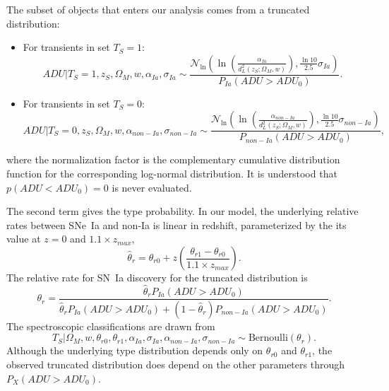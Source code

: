 \documentclass[preprint]{aastex}
\begin{document}
The subset of objects that enters our analysis comes from a truncated distribution:
\begin{itemize}
\item For transients in set $T_S=1$:
\begin{equation}
\mathit{ADU} | T_S=1, z_S, \Omega_M, w, \alpha_{Ia},\sigma_{Ia} \sim
\frac{\mathcal{N}_{\ln}\left(\ln{\left(\frac{\alpha_{Ia}}{d_L^2(z_S;\Omega_M, w)}\right)}, \frac{\ln{10}}{2.5}\sigma_{Ia}\right)}{P_{Ia}(\mathit{ADU} > \mathit{ADU}_0)}.
\label{adusnIa:eqn}
\end{equation}
\item For transients in set $T_S=0$:
\begin{equation}
\mathit{ADU} | T_S=0, z_S, \Omega_M, w, \alpha_{\mathit{non-Ia}},\sigma_{\mathit{non-Ia}}\sim 
\frac{\mathcal{N}_{\ln}\left(\ln{\left(\frac{\alpha_{\mathit{non-Ia}}}{d_L^2(z_S;\Omega_M, w)}\right)}, \frac{\ln{10}}{2.5}\sigma_{\mathit{non-Ia}}\right)}{P_{non-Ia}(\mathit{ADU} > \mathit{ADU}_0)},
\label{adunonIa:eqn}
\end{equation}
\end{itemize}
where the normalization factor is the complementary cumulative distribution function
for the corresponding log-normal distribution.
It is understood that $p(\mathit{ADU}<\mathit{ADU}_0)=0$ is never evaluated.

The second term gives the type probability. In our model,
the underlying relative rates between SNe~Ia and non-Ia is linear in redshift,
 parameterized by the
its value at $z=0$ and $1.1 \times z_{max}$, 
\begin{equation}
\hat{\theta}_{r}=\theta_{r0}+z\left(\frac{\theta_{r1}-\theta_{r0}}{1.1 \times z_{max}}\right).
\end{equation}
The relative rate for SN~Ia discovery for the truncated distribution is
\begin{equation}
\theta_{r}=\frac{\hat{\theta}_{r}P_{Ia}(\mathit{ADU} > \mathit{ADU}_0)}{\hat{\theta}_{r}P_{Ia}(\mathit{ADU} > \mathit{ADU}_0) + (1-\hat{\theta}_{r})P_{non-Ia}(\mathit{ADU} > \mathit{ADU}_0)}.
\end{equation}
The spectroscopic classifications are drawn from
\begin{equation}
T_S | \Omega_M, w, \theta_{r0}, \theta_{r1} , \alpha_{Ia},\sigma_{Ia}, \alpha_{\mathit{non-Ia}},\sigma_{\mathit{non-Ia}} \sim \text{Bernoulli}(\theta_r).
\end{equation}
Although the underlying type distribution depends only on $ \theta_{r0}$ and $ \theta_{r1}$,  
the observed truncated distribution does depend on the other parameters through 
$P_{X}(\mathit{ADU} > \mathit{ADU}_0)$.
\end{document}

